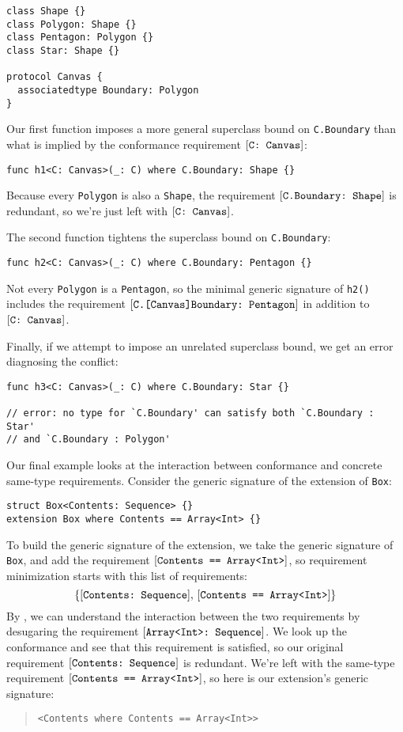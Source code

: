 \documentclass[../generics]{subfiles}
\begin{document}
\begin{Verbatim}
class Shape {}
class Polygon: Shape {}
class Pentagon: Polygon {}
class Star: Shape {}

protocol Canvas {
  associatedtype Boundary: Polygon
}
\end{Verbatim}

Our first function imposes a more general superclass bound on \texttt{C.Boundary} than what is implied by the conformance requirement $[\texttt{C:~Canvas}]$:
\begin{Verbatim}
func h1<C: Canvas>(_: C) where C.Boundary: Shape {}
\end{Verbatim}
Because every \texttt{Polygon} is also a \texttt{Shape}, the requirement $[\texttt{C.Boundary:~Shape}]$ is redundant, so we're just left with $[\texttt{C:~Canvas}]$.

The second function tightens the superclass bound on \texttt{C.Boundary}:
\begin{Verbatim}
func h2<C: Canvas>(_: C) where C.Boundary: Pentagon {}
\end{Verbatim}
Not every \texttt{Polygon} is a \texttt{Pentagon}, so the minimal generic signature of \texttt{h2()} includes the requirement $[\texttt{C.[Canvas]Boundary:~Pentagon}]$ in addition to $[\texttt{C:~Canvas}]$.

Finally, if we attempt to impose an unrelated superclass bound, we get an error diagnosing the conflict:
\begin{Verbatim}
func h3<C: Canvas>(_: C) where C.Boundary: Star {}

// error: no type for `C.Boundary' can satisfy both `C.Boundary : Star'
// and `C.Boundary : Polygon'
\end{Verbatim}

Our final example looks at the interaction between conformance and concrete same-type requirements. Consider the generic signature of the extension of \texttt{Box}:
\begin{Verbatim}
struct Box<Contents: Sequence> {}
extension Box where Contents == Array<Int> {}
\end{Verbatim}
To build the generic signature of the extension, we take the generic signature of \texttt{Box}, and add the requirement $[\texttt{Contents == Array<Int>}]$, so requirement minimization starts with this list of requirements:
\[\{[\texttt{Contents:~Sequence}],\,[\texttt{Contents == Array<Int>}]\}\]
By , we can understand the interaction between the two requirements by desugaring the requirement $[\texttt{Array<Int>:~Sequence}]$. We look up the conformance and see that this requirement is satisfied, so our original requirement $[\texttt{Contents:~Sequence}]$ is redundant. We're left with the same-type requirement $[\texttt{Contents == Array<Int>}]$, so here is our extension's generic signature:
\begin{quote}
\begin{verbatim}
<Contents where Contents == Array<Int>>
\end{verbatim}
\end{quote}
\end{document}
